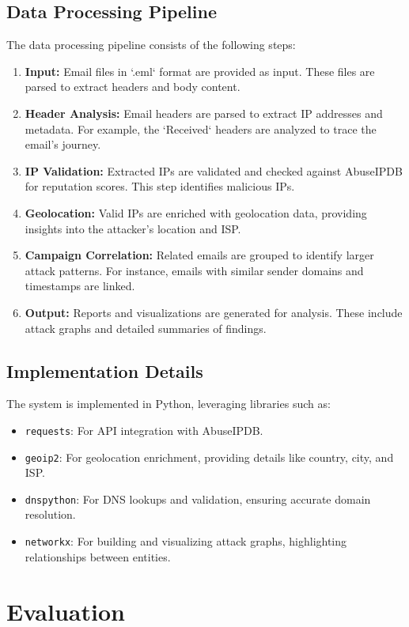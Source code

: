 \documentclass[conference]{IEEEtran}
\begin{document}
\subsection{Data Processing Pipeline}
The data processing pipeline consists of the following steps:
\begin{enumerate}
    \item \textbf{Input:} Email files in `.eml` format are provided as input. These files are parsed to extract headers and body content.
    \item \textbf{Header Analysis:} Email headers are parsed to extract IP addresses and metadata. For example, the `Received` headers are analyzed to trace the email's journey.
    \item \textbf{IP Validation:} Extracted IPs are validated and checked against AbuseIPDB for reputation scores. This step identifies malicious IPs.
    \item \textbf{Geolocation:} Valid IPs are enriched with geolocation data, providing insights into the attacker's location and ISP.
    \item \textbf{Campaign Correlation:} Related emails are grouped to identify larger attack patterns. For instance, emails with similar sender domains and timestamps are linked.
    \item \textbf{Output:} Reports and visualizations are generated for analysis. These include attack graphs and detailed summaries of findings.
\end{enumerate}

\subsection{Implementation Details}
The system is implemented in Python, leveraging libraries such as:
\begin{itemize}
    \item \texttt{requests}: For API integration with AbuseIPDB.
    \item \texttt{geoip2}: For geolocation enrichment, providing details like country, city, and ISP.
    \item \texttt{dnspython}: For DNS lookups and validation, ensuring accurate domain resolution.
    \item \texttt{networkx}: For building and visualizing attack graphs, highlighting relationships between entities.
\end{itemize}

\section{Evaluation}
\end{document}

